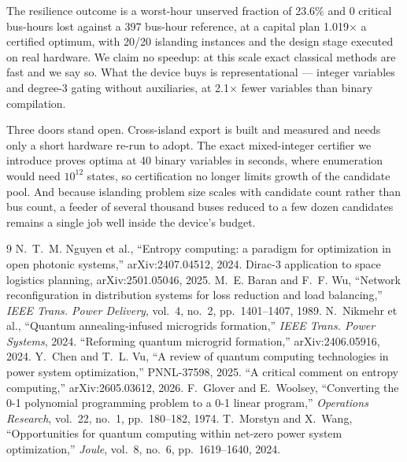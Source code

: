 \documentclass[11pt,twocolumn]{article}
\begin{document}
The resilience outcome is a worst-hour unserved fraction of 23.6\% and 0 critical bus-hours lost against a 397 bus-hour reference, at a capital plan 1.019$\times$ a certified optimum, with 20/20 islanding instances and the design stage executed on real hardware. We claim no speedup: at this scale exact classical methods are fast and we say so. What the device buys is representational --- integer variables and degree-3 gating without auxiliaries, at 2.1$\times$ fewer variables than binary compilation.

Three doors stand open. Cross-island export is built and measured and needs only a short hardware re-run to adopt. The exact mixed-integer certifier we introduce proves optima at 40 binary variables in seconds, where enumeration would need $10^{12}$ states, so certification no longer limits growth of the candidate pool. And because islanding problem size scales with candidate count rather than bus count, a feeder of several thousand buses reduced to a few dozen candidates remains a single job well inside the device's budget.

\balance
\onecolumn
\begin{thebibliography}{9}\small
{} N.~T.~M. Nguyen et al., ``Entropy computing: a paradigm for
optimization in open photonic systems,'' arXiv:2407.04512, 2024.
 Dirac-3 application to space logistics planning,
arXiv:2501.05046, 2025.
 M.~E. Baran and F.~F. Wu, ``Network reconfiguration in
distribution systems for loss reduction and load balancing,''
\textit{IEEE Trans. Power Delivery}, vol.~4, no.~2, pp.~1401--1407, 1989.
 N.~Nikmehr et al., ``Quantum annealing-infused microgrids
formation,'' \textit{IEEE Trans. Power Systems}, 2024.
 ``Reforming quantum microgrid formation,'' arXiv:2406.05916, 2024.
 Y.~Chen and T.~L. Vu, ``A review of quantum computing
technologies in power system optimization,'' PNNL-37598, 2025.
 ``A critical comment on entropy computing,''
arXiv:2605.03612, 2026.
 F.~Glover and E.~Woolsey, ``Converting the 0-1 polynomial
programming problem to a 0-1 linear program,'' \textit{Operations Research},
vol.~22, no.~1, pp.~180--182, 1974.
 T.~Morstyn and X.~Wang, ``Opportunities for quantum
computing within net-zero power system optimization,'' \textit{Joule}, vol.~8,
no.~6, pp.~1619--1640, 2024.
\end{thebibliography}
\end{document}
